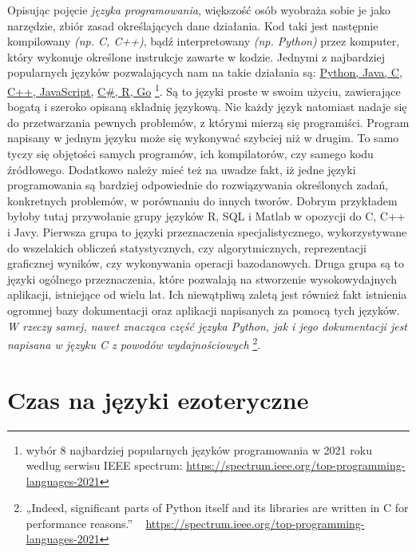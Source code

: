 \documentclass[fleqn,10pt]{SelfArx} %
\begin{document}
	Opisując pojęcie \textit{języka programowania}, większość osób wyobraża sobie je jako narzędzie,
	zbiór zasad określających dane działania. Kod taki jest następnie kompilowany \textit{(np. C, C++)}, 
	bądź interpretowany \textit{(np. Python)} przez komputer, który wykonuje określone instrukcje zawarte w kodzie.
	Jednymi z najbardziej popularnych języków pozwalających nam na takie działania są: \underline{Python, Java, C, C++, JavaScript,} \underline{C\#, R, Go} 
	\cite{IEEESpectrum:popularLang2021}\footnote{wybór 8 najbardziej popularnych języków programowania w 2021 roku według serwisu IEEE spectrum:
		\url{https://spectrum.ieee.org/top-programming-languages-2021}}.
	Są to języki proste w swoim użyciu, zawierające bogatą i szeroko opisaną składnię językową. 
	Nie każdy język natomiast nadaje się do przetwarzania pewnych problemów, z którymi mierzą się programiści. 
	Program napisany w jednym języku może się wykonywać szybciej niż w drugim. To samo tyczy się objętości samych programów, 
	ich kompilatorów, czy samego kodu źródłowego. Dodatkowo należy mieć też na uwadze fakt, 
	iż jedne języki programowania są bardziej odpowiednie do rozwiązywania określonych zadań, konkretnych problemów, 
	w porównaniu do innych tworów.
	\indent Dobrym przykładem byłoby tutaj przywołanie grupy języków R, SQL i Matlab w opozycji do C, C++ i Javy. 
	Pierwsza grupa to języki przeznaczenia specjalistycznego, wykorzystywane do wszelakich obliczeń statystycznych, 
	czy algorytmicznych, reprezentacji graficznej wyników, czy wykonywania operacji bazodanowych. 
	Druga grupa są to języki ogólnego przeznaczenia, które pozwalają na stworzenie wysokowydajnych aplikacji, istniejące od wielu lat. 
	Ich niewątpliwą zaletą jest również fakt istnienia ogromnej bazy dokumentacji oraz aplikacji napisanych za pomocą tych języków. 
	\textit{W rzeczy samej, nawet znacząca część języka Python, jak i jego dokumentacji jest napisana w języku C z powodów wydajnościowych}
	\cite{IEEESpectrum:popularLang2021}\footnote{„Indeed, significant parts of Python itself and its libraries are written in C for performance reasons.” ~ \url{https://spectrum.ieee.org/top-programming-languages-2021}}.


\section{Czas na języki ezoteryczne}
\end{document}
